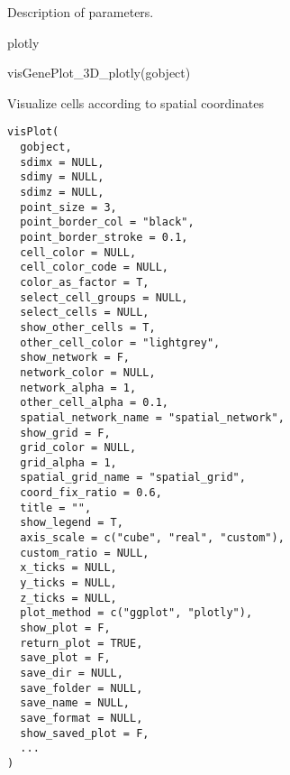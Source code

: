 \documentclass[a4paper]{book}
\begin{document}
%
\begin{Details}\relax
Description of parameters.
\end{Details}
%
\begin{Value}
plotly
\end{Value}
%
\begin{Examples}
\begin{ExampleCode}
    visGenePlot_3D_plotly(gobject)
\end{ExampleCode}
\end{Examples}
%
\begin{Description}\relax
Visualize cells according to spatial coordinates
\end{Description}
%
\begin{Usage}
\begin{verbatim}
visPlot(
  gobject,
  sdimx = NULL,
  sdimy = NULL,
  sdimz = NULL,
  point_size = 3,
  point_border_col = "black",
  point_border_stroke = 0.1,
  cell_color = NULL,
  cell_color_code = NULL,
  color_as_factor = T,
  select_cell_groups = NULL,
  select_cells = NULL,
  show_other_cells = T,
  other_cell_color = "lightgrey",
  show_network = F,
  network_color = NULL,
  network_alpha = 1,
  other_cell_alpha = 0.1,
  spatial_network_name = "spatial_network",
  show_grid = F,
  grid_color = NULL,
  grid_alpha = 1,
  spatial_grid_name = "spatial_grid",
  coord_fix_ratio = 0.6,
  title = "",
  show_legend = T,
  axis_scale = c("cube", "real", "custom"),
  custom_ratio = NULL,
  x_ticks = NULL,
  y_ticks = NULL,
  z_ticks = NULL,
  plot_method = c("ggplot", "plotly"),
  show_plot = F,
  return_plot = TRUE,
  save_plot = F,
  save_dir = NULL,
  save_folder = NULL,
  save_name = NULL,
  save_format = NULL,
  show_saved_plot = F,
  ...
)
\end{verbatim}
\end{Usage}
%
\end{document}

